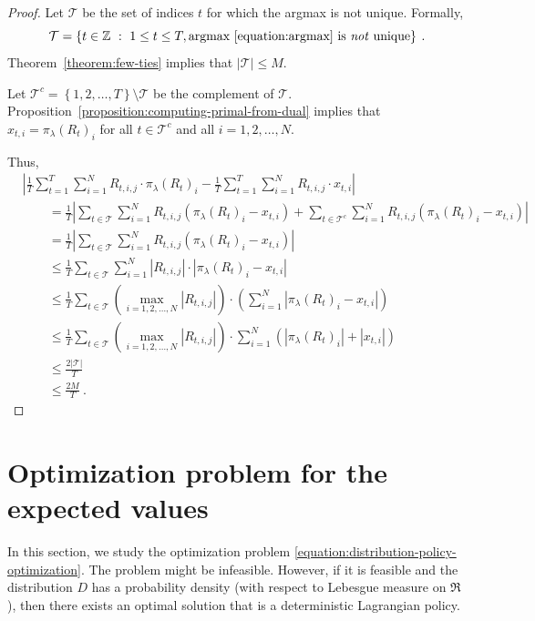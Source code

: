 \documentclass[12pt]{article}
\newcommand{\Z}{\mathbb{Z}}
\newcommand{\Requests}{\mathfrak{R}}
\newcommand{\T}{\mathcal{T}}
\theoremstyle{definition}
\begin{document}
\begin{proof}
Let $\T$ be the set of indices $t$ for which the argmax is not unique. Formally,
$$
\T = \left\{ t \in \Z ~:~ 1 \le t \le T, \text{argmax \eqref{equation:argmax} is \emph{not} unique} \right\} \: .
$$
Theorem~\ref{theorem:few-ties} implies that $|\T| \le M$.

Let $\T^c = \left\{1,2,\dots,T\right\} \setminus \T$ be the complement of $\T$.
Proposition~\ref{proposition:computing-primal-from-dual} implies that $x_{t,i} =
\pi_\lambda(R_t)_i$ for all $t \in \T^c$ and all $i = 1,2,\dots,N$.

Thus,
\begin{align*}
& \left| \frac{1}{T} \sum_{t=1}^T \sum_{i=1}^N R_{t,i,j} \cdot \pi_\lambda(R_t)_i - \frac{1}{T} \sum_{t=1}^T \sum_{i=1}^N R_{t,i,j} \cdot x_{t,i}  \right| \\
& \qquad = \frac{1}{T} \left| \sum_{t \in \T} \sum_{i=1}^N R_{t,i,j} \left( \pi_\lambda(R_t)_i - x_{t,i}  \right) + \sum_{t \in \T^c} \sum_{i=1}^N R_{t,i,j} \left( \pi_\lambda(R_t)_i - x_{t,i} \right) \right|  \\
& \qquad = \frac{1}{T} \left| \sum_{t \in \T} \sum_{i=1}^N R_{t,i,j} \left( \pi_\lambda(R_t)_i - x_{t,i} \right) \right| \\
& \qquad \le \frac{1}{T} \sum_{t \in \T} \sum_{i=1}^N \left| R_{t,i,j} \right| \cdot \left| \pi_\lambda(R_t)_i - x_{t,i} \right| \\
& \qquad \le \frac{1}{T} \sum_{t \in \T} \left( \max_{i=1,2,\dots,N} \left| R_{t,i,j} \right| \right) \cdot \left( \sum_{i=1}^N \left| \pi_\lambda(R_t)_i - x_{t,i} \right| \right) \\
& \qquad \le \frac{1}{T} \sum_{t \in \T} \left( \max_{i=1,2,\dots,N} \left| R_{t,i,j} \right| \right) \cdot \sum_{i=1}^N \left( \left| \pi_\lambda(R_t)_i \right| + \left| x_{t,i} \right| \right) \\
& \qquad \le \frac{2|\T|}{T} \\
& \qquad \le \frac{2M}{T} \: .
\end{align*}
\end{proof}

\section{Optimization problem for the expected values}

In this section, we study the optimization problem
\eqref{equation:distribution-policy-optimization}. The problem might be
infeasible. However, if it is feasible and the distribution $D$ has a
probability density (with respect to Lebesgue measure on $\Requests$), then
there exists an optimal solution that is a deterministic Lagrangian policy.
\end{document}
